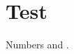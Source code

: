 \documentclass{article}
\begin{document}
\section{Test}\label{sec:test}
Numbers  and .


\end{document}
